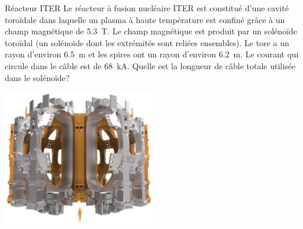 \documentclass{beamer}
\begin{document}
\begin{frame}{Réacteur ITER}
  Le réacteur à fusion nucléaire ITER est constitué d'une cavité toroïdale dans
  laquelle un plasma à haute température est confiné grâce à un champ
  magnétique de \SI{5.3}{\tesla}. Le champ magnétique est produit par un
  solénoïde toroïdal (un solénoïde dont les extrémités sont reliées ensembles).
  Le tore a un rayon d'environ \SI{6.5}{\meter} et les spires ont un rayon
  d'environ \SI{6.2}{\meter}. Le courant qui circule dans le câble est de
  \SI{68}{\kilo\ampere}. Quelle est la longueur de câble totale utilisée dans
  le solénoïde?

  \begin{center}
    \includegraphics[width=0.5\textwidth]{figures/iter_toroidal_coil.jpg}
  \end{center}
\end{frame}
\end{document}
